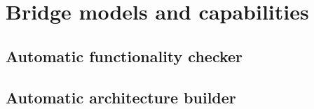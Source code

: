 \chapter[Bridge models and capabilities]{Bridge models and capabilities}\label{ch:Bridge}
\section{Automatic functionality checker}
\section{Automatic architecture builder}

